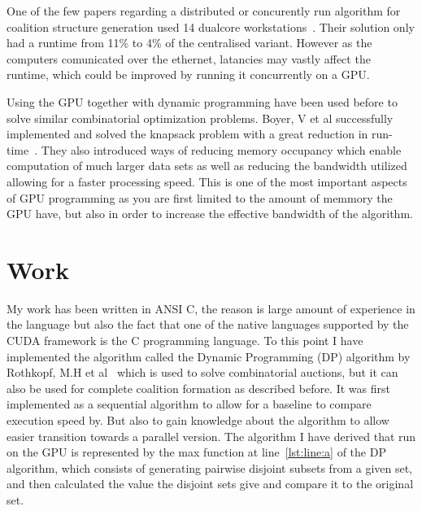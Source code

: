 \documentclass[a4paper, 12pt]{report}
\begin{document}
One of the few papers regarding a distributed or concurently run algorithm for coalition structure generation used 14 dualcore workstations~\cite{michalak2010distributed}.
Their solution only had a runtime from 11\% to 4\% of the centralised variant.
However as the computers comunicated over the ethernet, latancies may vastly affect the runtime, which could be improved by running it concurrently on a GPU.

Using the GPU together with dynamic programming have been used before to solve similar combinatorial optimization problems.
Boyer, V et al successfully implemented and solved the knapsack problem with a great reduction in run-time~\cite{boyer2012solving}.
They also introduced ways of reducing memory occupancy which enable computation of much larger data sets as well as reducing the bandwidth utilized allowing for a faster processing speed.
This is one of the most important aspects of GPU programming as you are first limited to the amount of memmory the GPU have, but also in order to increase the effective bandwidth of the algorithm.





\section{Work}
My work has been written in ANSI C, the reason is large amount of experience in the language but also the fact that one of the native languages supported by the CUDA framework is the C programming language.
To this point I have implemented the algorithm called the Dynamic Programming (DP) algorithm by Rothkopf, 
M.H et al~\cite{rothkopf1998computationally} which is used to solve combinatorial auctions, but it can also be used for complete coalition formation as described before.
It was first implemented as a sequential algorithm to allow for a baseline to compare execution speed by.
But also to gain knowledge about the algorithm to allow easier transition towards a parallel version.
The algorithm I have derived that run on the GPU is represented by the max function at line~\ref{lst:line:a} of the DP algorithm, 
which consists of generating pairwise disjoint subsets from a given set, and then calculated the value the disjoint sets give and compare it to the original set. 

\thispagestyle{empty}

\thispagestyle{empty}
\pagestyle{empty}
\end{document}
